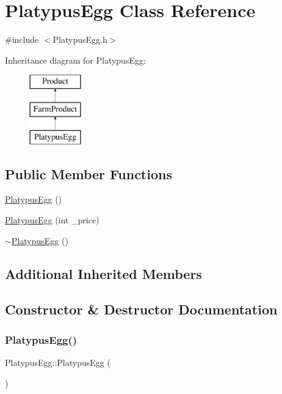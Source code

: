 \hypertarget{classPlatypusEgg}{}\section{Platypus\+Egg Class Reference}
\label{classPlatypusEgg}


{\ttfamily \#include $<$Platypus\+Egg.\+h$>$}

Inheritance diagram for Platypus\+Egg\+:\begin{figure}[H]
\begin{center}
\leavevmode
\includegraphics[height=3.000000cm]{classPlatypusEgg}
\end{center}
\end{figure}
\subsection*{Public Member Functions}
\begin{DoxyCompactItemize}
\item 
\mbox{\hyperlink{classPlatypusEgg_a750a5657fa715256d2bb7a653a22299b}{Platypus\+Egg}} ()
\item 
\mbox{\hyperlink{classPlatypusEgg_ad5303313d178847e813ae1e4b2d92a6d}{Platypus\+Egg}} (int \+\_\+price)
\item 
\mbox{\hyperlink{classPlatypusEgg_a94bde95b8b3d41f24d820429b156ce19}{$\sim$\+Platypus\+Egg}} ()
\end{DoxyCompactItemize}
\subsection*{Additional Inherited Members}


\subsection{Constructor \& Destructor Documentation}
\mbox{\label{classPlatypusEgg_a750a5657fa715256d2bb7a653a22299b}} 
\subsubsection{\texorpdfstring{PlatypusEgg()}{PlatypusEgg()}\hspace{0.1cm}{\footnotesize\ttfamily [1/2]}}
{\footnotesize\ttfamily Platypus\+Egg\+::\+Platypus\+Egg (\begin{DoxyParamCaption}{ }\end{DoxyParamCaption})}

